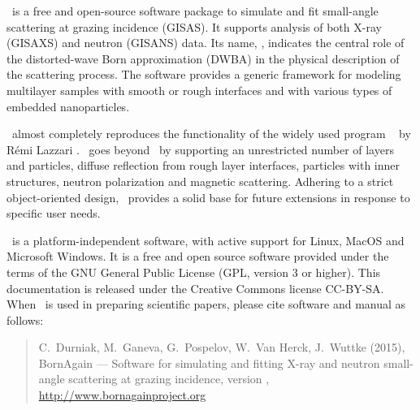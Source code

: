 

\cleardoublepage
{}

\BornAgain\ is a free and open-source software package
to simulate and fit small-angle
scattering at grazing incidence (GISAS). 
It supports analysis of both X-ray (GISAXS) and neutron (GISANS) data.
Its name, \BornAgain,
indicates the central role of the distorted-wave Born
approximation (DWBA) in the physical description of the
scattering process.
The software provides a generic framework for modeling multilayer samples with smooth or
rough interfaces and with various types of embedded nano\-particles.

\BornAgain\ almost completely reproduces the functionality
of the widely used program \IsGISAXS\
by R\'emi Lazzari \cite{Laz02}.
\BornAgain\ goes beyond \IsGISAXS\ by
supporting an unrestricted number of layers and particles, 
diffuse reflection from rough layer interfaces,
particles with inner structures, neutron polarization and magnetic scattering.
Adhering to a strict object-oriented design,
\BornAgain\ provides a solid base for future extensions
in response to specific user needs.

\BornAgain\ is a platform-independent software,
with active support for
Linux,
MacOS
and  Microsoft Windows.
It is a free and open source software provided under the terms
of the GNU General Public License (GPL, version 3 or higher).
This documentation is released under the Creative Commons license CC-BY-SA.
When \BornAgain\ is used in preparing scientific papers,
please cite software and manual as follows:
\begin{quote}
C.~Durniak, M.~Ganeva, G.~Pospelov, W.~Van Herck, J.~Wuttke (2015),\newline
BornAgain --- Software for simulating and fitting
X-ray and neutron small-angle scattering at grazing incidence,
version \UserManualVersionNumber,\newline
\url{http://www.bornagainproject.org}
\end{quote}

